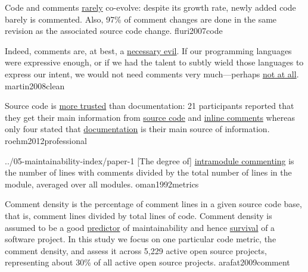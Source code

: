\documentclass{article}
\begin{document}
  {Code and comments \ul{rarely} co-evolve: despite its growth rate, newly added code barely is commented. Also, 97\% of comment changes are done in the same revision as the associated source code change.}
  {fluri2007code}

  {Indeed, comments are, at best, a \ul{necessary evil}. If our programming languages were expressive enough, or if we had the talent to subtly wield those languages to express our intent, we would not need comments very much---perhaps \ul{not at all}.}
  {martin2008clean}

  {Source code is \ul{more trusted} than documentation: 21 participants reported that they get their main information from \ul{source code} and \ul{inline comments} whereas only four stated that \ul{documentation} is their main source of information.}
  {roehm2012professional}


\lnQuote
  {../05-maintainability-index/paper-1}
  {[The degree of] \ul{intramodule commenting} is the number of lines with comments divided by the total number of lines in the module, averaged over all modules.}
  {oman1992metrics}

  {Comment density is the percentage of comment lines in a given source code base, that is, comment lines divided by total lines of code. Comment density is assumed to be a good \ul{predictor} of maintainability and hence \ul{survival} of a software project. In this study we focus on one particular code metric, the comment density, and assess it across 5,229 active open source projects, representing about 30\% of all active open source projects.}
  {arafat2009comment}
\end{document}
